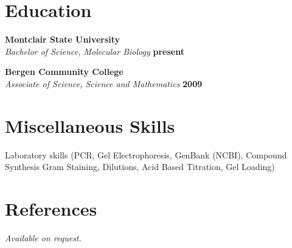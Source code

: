 \documentclass[margin,line]{resume}
\begin{document}
\begin{resume}
    \section{\mysidestyle Education}

    \textbf{Montclair State University} \vspace{2mm}\\\vspace{1mm}%
    \textsl{Bachelor of Science, Molecular Biology} \hfill \textbf{present}\vspace{-3mm}\\\vspace{-1mm}%

    \textbf{Bergen Community College} \vspace{2mm}\\\vspace{1mm}%
    \textsl{Associate of Science, Science and Mathematics} \hfill \textbf{2009}\vspace{-3mm}\\\vspace{-1mm}%

    \section{\mysidestyle Miscellaneous Skills}
    Laboratory skills (PCR, Gel Electrophoresis, GenBank (NCBI), Compound Synthesis
      Gram Staining, Dilutions, Acid Based Titration, Gel Loading)


    \section{\mysidestyle References} 
    {\sl Available on request.}


\end{resume}
\end{document}
